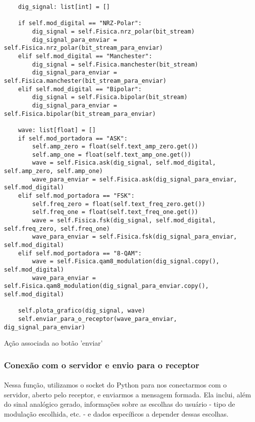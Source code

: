 \documentclass[12pt, a4paper]{article}
\newenvironment{code}{\captionsetup{type=listing}}{}
\begin{document}
\begin{code}
\begin{verbatim}
    dig_signal: list[int] = []
    
    if self.mod_digital == "NRZ-Polar":
        dig_signal = self.Fisica.nrz_polar(bit_stream)
        dig_signal_para_enviar = self.Fisica.nrz_polar(bit_stream_para_enviar)
    elif self.mod_digital == "Manchester":
        dig_signal = self.Fisica.manchester(bit_stream)
        dig_signal_para_enviar = self.Fisica.manchester(bit_stream_para_enviar)
    elif self.mod_digital == "Bipolar": 
        dig_signal = self.Fisica.bipolar(bit_stream)
        dig_signal_para_enviar = self.Fisica.bipolar(bit_stream_para_enviar)
        
    wave: list[float] = []
    if self.mod_portadora == "ASK":
        self.amp_zero = float(self.text_amp_zero.get())
        self.amp_one = float(self.text_amp_one.get())
        wave = self.Fisica.ask(dig_signal, self.mod_digital, self.amp_zero, self.amp_one)
        wave_para_enviar = self.Fisica.ask(dig_signal_para_enviar, self.mod_digital)
    elif self.mod_portadora == "FSK":
        self.freq_zero = float(self.text_freq_zero.get())
        self.freq_one = float(self.text_freq_one.get())
        wave = self.Fisica.fsk(dig_signal, self.mod_digital, self.freq_zero, self.freq_one)
        wave_para_enviar = self.Fisica.fsk(dig_signal_para_enviar, self.mod_digital)
    elif self.mod_portadora == "8-QAM":
        wave = self.Fisica.qam8_modulation(dig_signal.copy(), self.mod_digital)
        wave_para_enviar = self.Fisica.qam8_modulation(dig_signal_para_enviar.copy(), self.mod_digital)
        
    self.plota_grafico(dig_signal, wave)
    self.enviar_para_o_receptor(wave_para_enviar, dig_signal_para_enviar)
\end{verbatim}
\caption{Ação associada ao botão 'enviar'}
\end{code}

\subsubsection{Conexão com o servidor e envio para o receptor}
\paragraph{}
Nessa função, utilizamos o socket do Python para nos conectarmos com o servidor, aberto pelo receptor, e enviarmos a mensagem formada. Ela inclui, além do sinal analógico gerado, informações sobre as escolhas do usuário - tipo de modulação escolhida, etc. - e dados específicos a depender dessas escolhas.
\end{document}
